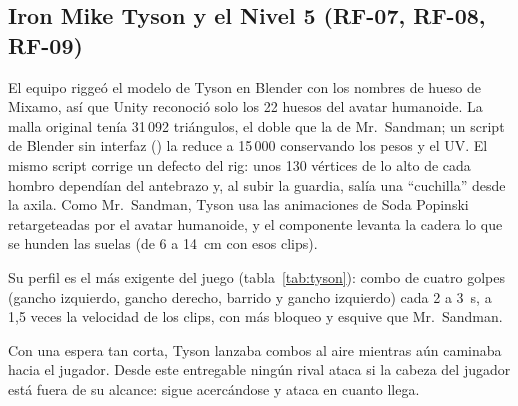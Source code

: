 \subsection{Iron Mike Tyson y el Nivel 5 (RF-07, RF-08, RF-09)}
\label{sec:tyson}
El equipo riggeó el modelo de Tyson en Blender con los nombres de hueso de Mixamo, así que Unity reconoció solo los 22 huesos del avatar humanoide. La malla original tenía 31\,092 triángulos, el doble que la de Mr.\ Sandman; un script de Blender sin interfaz () la reduce a 15\,000 conservando los pesos y el UV. El mismo script corrige un defecto del rig: unos 130 vértices de lo alto de cada hombro dependían del antebrazo y, al subir la guardia, salía una ``cuchilla'' desde la axila. Como Mr.\ Sandman, Tyson usa las animaciones de Soda Popinski retargeteadas por el avatar humanoide, y el componente  levanta la cadera lo que se hunden las suelas (de 6 a 14~cm con esos clips).

Su perfil es el más exigente del juego (tabla~\ref{tab:tyson}): combo de cuatro golpes (gancho izquierdo, gancho derecho, barrido y gancho izquierdo) cada 2 a 3~s, a 1,5 veces la velocidad de los clips, con más bloqueo y esquive que Mr.\ Sandman.

\begin{table}[H]
\centering
\caption{Perfil de Iron Mike Tyson frente a Mr.\ Sandman.}
\label{tab:tyson}
\end{table}

Con una espera tan corta, Tyson lanzaba combos al aire mientras aún caminaba hacia el jugador. Desde este entregable ningún rival ataca si la cabeza del jugador está fuera de su alcance: sigue acercándose y ataca en cuanto llega.


